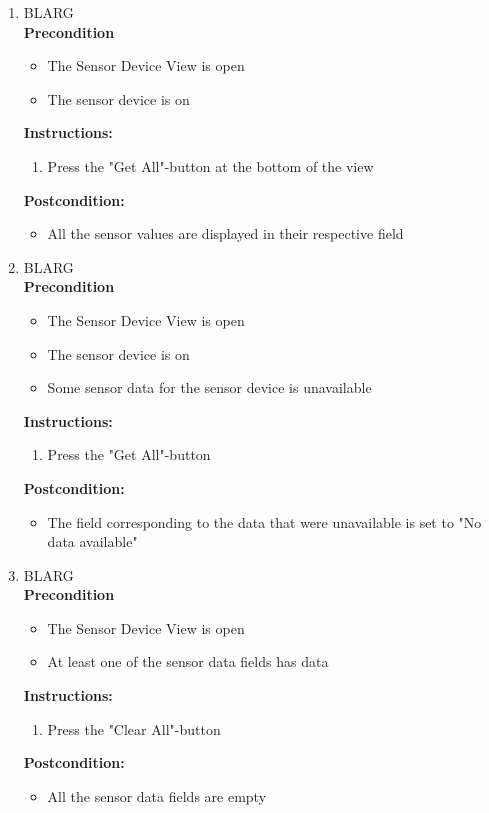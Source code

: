 \documentclass[a4paper]{article}
\newlength{\testlabellength}
\newenvironment{testlist}{\begin{enumerate}[label=\bfseries Instruction \thesubsection.\arabic* , labelindent=0pt, labelwidth=\testlabellength , leftmargin=2cm]}{\end{enumerate}}
\newenvironment{precondition}{
{\color{white}BLARG}\\ 
\textbf{Precondition}
\begin{itemize}[labelindent=0cm, labelwidth=2cm , leftmargin=1cm]
}
{\end{itemize}}
\newenvironment{instruction}{
\textbf{Instructions:}
\begin{enumerate}[label=\bfseries  \arabic*., labelindent=0cm, labelwidth=2cm , leftmargin=1cm]
}
{\end{enumerate}}
\newenvironment{postcondition}{
\textbf{Postcondition:}
\begin{itemize}[labelindent=0cm, labelwidth=2cm , leftmargin=1cm]
}
{\end{itemize}}
\begin{document}
\begin{appendices}
\begin{testlist}

	\item
		\begin{precondition} 
			\item The Sensor Device View is open
			\item The sensor device is on
		\end{precondition}
		\begin{instruction}
			\item Press the "Get All"-button at the bottom of the view
		\end{instruction}
		\begin{postcondition}
			\item All the sensor values are displayed in their respective field
		\end{postcondition}

	\item
		\begin{precondition}
			\item The Sensor Device View is open
			\item The sensor device is on
    	    \item Some sensor data for the sensor device is unavailable
		\end{precondition}
		\begin{instruction}
			\item Press the "Get All"-button
		\end{instruction}
		\begin{postcondition} 
			\item The field corresponding to the data that were unavailable is set to "No data available"
		\end{postcondition}

	\item
		\begin{precondition} 
			\item The Sensor Device View is open
			\item At least one of the sensor data fields has data
		\end{precondition}
		\begin{instruction} 
			\item Press the "Clear All"-button
		\end{instruction}
	  	\begin{postcondition}
			\item All the sensor data fields are empty
		\end{postcondition}


\end{testlist}
\end{appendices}
\end{document}
